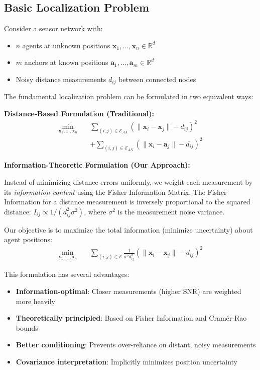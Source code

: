 \documentclass[11pt,a4paper]{article}
\begin{document}
\subsection{Basic Localization Problem}

Consider a sensor network with:
\begin{itemize}
    \item $n$ agents at unknown positions $\mathbf{x}_1, \ldots, \mathbf{x}_n \in \mathbb{R}^d$
    \item $m$ anchors at known positions $\mathbf{a}_1, \ldots, \mathbf{a}_m \in \mathbb{R}^d$
    \item Noisy distance measurements $d_{ij}$ between connected nodes
\end{itemize}

The fundamental localization problem can be formulated in two equivalent ways:

\textbf{Distance-Based Formulation (Traditional):}
\begin{equation}
\boxed{
\begin{aligned}
\min_{\mathbf{x}_1, \ldots, \mathbf{x}_n} \quad & \sum_{(i,j) \in \mathcal{E}_{AA}} \left(\|\mathbf{x}_i - \mathbf{x}_j\| - d_{ij}\right)^2 \\
& + \sum_{(i,j) \in \mathcal{E}_{AN}} \left(\|\mathbf{x}_i - \mathbf{a}_j\| - d_{ij}\right)^2
\end{aligned}
}
\label{eq:basic_problem}
\end{equation}

\textbf{Information-Theoretic Formulation (Our Approach):}

Instead of minimizing distance errors uniformly, we weight each measurement by its \emph{information content} using the Fisher Information Matrix. The Fisher Information for a distance measurement is inversely proportional to the squared distance: $I_{ij} \propto 1/(d_{ij}^2 \sigma^2)$, where $\sigma^2$ is the measurement noise variance.

Our objective is to maximize the total information (minimize uncertainty) about agent positions:
\begin{equation}
\boxed{
\begin{aligned}
\min_{\mathbf{x}_1, \ldots, \mathbf{x}_n} \quad & \sum_{(i,j) \in \mathcal{E}} \frac{1}{\sigma^2 d_{ij}^2} \left(\|\mathbf{x}_i - \mathbf{x}_j\| - d_{ij}\right)^2
\end{aligned}
}
\label{eq:fisher_problem}
\end{equation}

This formulation has several advantages:
\begin{itemize}
    \item \textbf{Information-optimal}: Closer measurements (higher SNR) are weighted more heavily
    \item \textbf{Theoretically principled}: Based on Fisher Information and Cramér-Rao bounds
    \item \textbf{Better conditioning}: Prevents over-reliance on distant, noisy measurements
    \item \textbf{Covariance interpretation}: Implicitly minimizes position uncertainty
\end{itemize}
\end{document}
